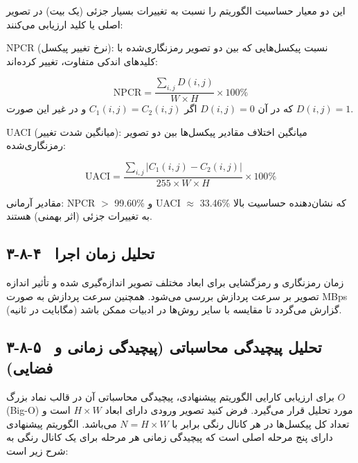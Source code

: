 این دو معیار حساسیت الگوریتم را نسبت به تغییرات بسیار جزئی (یک بیت) در تصویر اصلی یا کلید ارزیابی می‌کنند:

‎NPCR‎ (نرخ تغییر پیکسل):  نسبت پیکسل‌هایی که بین دو تصویر رمزنگاری‌شده با کلیدهای اندکی متفاوت، تغییر کرده‌اند:

\begin{equation}
\mathrm{NPCR} = \frac{\sum_{i,j} D(i,j)}{W \times H} \times 100\%
\label{eq:ch3-npcr}
\end{equation}
که در آن $D(i,j)=0$ اگر $C_1(i,j)=C_2(i,j)$ و در غیر این صورت $D(i,j)=1$.

‎UACI‎ (میانگین شدت تغییر): میانگین اختلاف مقادیر پیکسل‌ها بین دو تصویر رمزنگاری‌شده:

\begin{equation}
\mathrm{UACI} = \frac{\sum_{i,j} \left|C_1(i,j)-C_2(i,j)\right|}{255 \times W \times H} \times 100\%
\label{eq:ch3-uaci}
\end{equation}

مقادیر آرمانی: ‎NPCR‎ $>$ ‎99.60\%‎ و ‎UACI‎ $\approx$ ‎33.46\%‎ که نشان‌دهنده حساسیت بالا به تغییرات جزئی (اثر بهمنی) هستند\cite{ref10}.

\subsection{۳-۸-۴  تحلیل زمان اجرا}

زمان رمزنگاری و رمزگشایی برای ابعاد مختلف تصویر اندازه‌گیری شده و تأثیر اندازه تصویر بر سرعت پردازش بررسی می‌شود. همچنین سرعت پردازش به صورت ‎MBps‎ (مگابایت در ثانیه) گزارش می‌گردد تا مقایسه با سایر روش‌ها در ادبیات ممکن باشد.

\subsection{۳-۸-۵  تحلیل پیچیدگی محاسباتی (پیچیدگی زمانی و فضایی)}

برای ارزیابی کارایی الگوریتم پیشنهادی، پیچیدگی محاسباتی آن در قالب نماد بزرگ $O$ (‎Big-O‎) مورد تحلیل قرار می‌گیرد. فرض کنید تصویر ورودی دارای ابعاد $H \times W$ است و تعداد کل پیکسل‌ها در هر کانال رنگی برابر با $N = H \times W$ می‌باشد. الگوریتم پیشنهادی دارای پنج مرحله اصلی است که پیچیدگی زمانی هر مرحله برای یک کانال رنگی به شرح زیر است:

